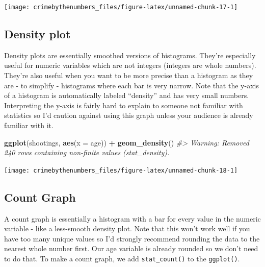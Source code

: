 \documentclass[
  12pt,
]{book}
\newenvironment{Shaded}{\begin{snugshade}}{\end{snugshade}}
\newcommand{\CommentTok}[1]{\textcolor[rgb]{0.37,0.37,0.37}{\textit{#1}}}
\newcommand{\DataTypeTok}[1]{\textcolor[rgb]{0.27,0.27,0.27}{#1}}
\newcommand{\KeywordTok}[1]{\textcolor[rgb]{0.27,0.27,0.27}{\textbf{#1}}}
\newcommand{\NormalTok}[1]{#1}
\newcommand{\OperatorTok}[1]{\textcolor[rgb]{0.43,0.43,0.43}{\textbf{#1}}}
\newcommand{\StringTok}[1]{\textcolor[rgb]{0.5,0.5,0.5}{#1}}
\begin{document}
\begin{center}\texttt{[image: crimebythenumbers\_files/figure-latex/unnamed-chunk-17-1]} \end{center}

\hypertarget{density-plot}{%
\subsection{Density plot}\label{density-plot}}

Density plots are essentially smoothed versions of histograms. They're especially useful for numeric variables which are not integers (integers are whole numbers). They're also useful when you want to be more precise than a histogram as they are - to simplify - histograms where each bar is very narrow. Note that the y-axis of a histogram is automatically labeled ``density'' and has very small numbers. Interpreting the y-axis is fairly hard to explain to someone not familiar with statistics so I'd caution against using this graph unless your audience is already familiar with it.

\begin{Shaded}
\begin{Highlighting}[]
\KeywordTok{ggplot}\NormalTok{(shootings, }\KeywordTok{aes}\NormalTok{(}\DataTypeTok{x =}\NormalTok{ age)) }\OperatorTok{+}\StringTok{ }
\StringTok{  }\KeywordTok{geom\_density}\NormalTok{()}
\CommentTok{\#> Warning: Removed 240 rows containing non{-}finite values (stat\_density).}
\end{Highlighting}
\end{Shaded}

\begin{center}\texttt{[image: crimebythenumbers\_files/figure-latex/unnamed-chunk-18-1]} \end{center}

\hypertarget{count-graph}{%
\subsection{Count Graph}\label{count-graph}}

A count graph is essentially a histogram with a bar for every value in the numeric variable - like a less-smooth density plot. Note that this won't work well if you have too many unique values so I'd strongly recommend rounding the data to the nearest whole number first. Our age variable is already rounded so we don't need to do that. To make a count graph, we add \texttt{stat\_count()} to the \texttt{ggplot()}.
\end{document}
